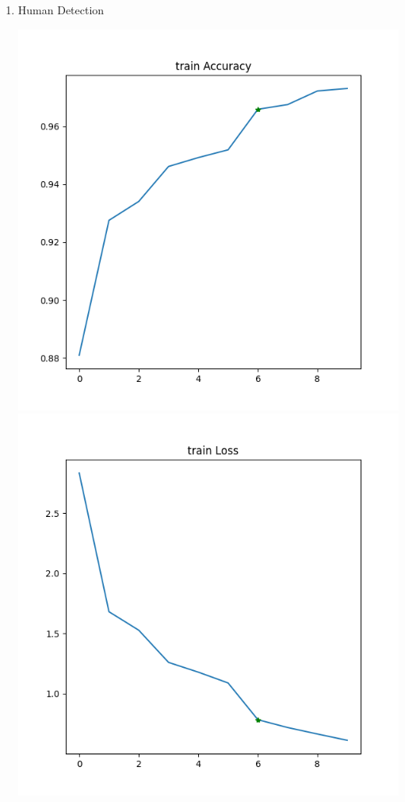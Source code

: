 \begin{enumerate}
    \item Human Detection


    \includegraphics[scale=0.5]{images/report/human-train-accuracy}
    \includegraphics[scale=0.5]{images/report/Human-train-loss}


\end{enumerate}
